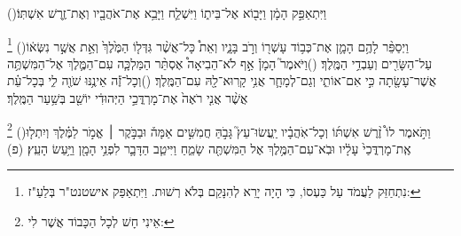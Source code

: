 \documentclass[12pt, openany]{book}
\newcommand{\footnotecomment}[1]{
	\renewcommand\thefootnote{}
	\footnote{\textsf{#1}}}
\newcommand{\commenta}[1]{\footnotecomment{#1}\hspace{0em}}
\newcommand{\vsnum}[1]{(\hebrewnumeral{#1})\space}
\begin{document}
\begin{multicols}{2}
\vsnum{10}וַיִּתְאַפַּ֣ק הָמָ֔ן וַיָּב֖וֹא אֶל־בֵּית֑וֹ וַיִּשְׁלַ֛ח וַיָּבֵ֥א אֶת־אֹהֲבָ֖יו וְאֶת־זֶ֥רֶשׁ אִשְׁתּֽוֹ׃%
\commenta{ נִתְחַזֵּק לַעֲמֹד עַל כַּעְסוֹ, כִּי הָיָה יָרֵא לְהִנָּקֵם בְּלֹא רְשׁוּת. וַיִּתְאַפַּק אישטנט"ר בְּלַעַ"ז: }%
\vsnum{11}וַיְסַפֵּ֨ר לָהֶ֥ם הָמָ֛ן אֶת־כְּב֥וֹד עָשְׁר֖וֹ וְרֹ֣ב בָּנָ֑יו וְאֵת֩ כָּל־אֲשֶׁ֨ר גִּדְּל֤וֹ הַמֶּ֙לֶךְ֙ וְאֵ֣ת אֲשֶׁ֣ר נִשְּׂא֔וֹ עַל־הַשָּׂרִ֖ים וְעַבְדֵ֥י הַמֶּֽלֶךְ׃
\vsnum{12}וַיֹּאמֶר֮ הָמָן֒ אַ֣ף לֹא־הֵבִיאָה֩ אֶסְתֵּ֨ר הַמַּלְכָּ֧ה עִם־הַמֶּ֛לֶךְ אֶל־הַמִּשְׁתֶּ֥ה אֲשֶׁר־עָשָׂ֖תָה כִּ֣י אִם־אוֹתִ֑י וְגַם־לְמָחָ֛ר אֲנִ֥י קָֽרוּא־לָ֖הּ עִם־הַמֶּֽלֶךְ׃
\vsnum{13}וְכָל־זֶ֕ה אֵינֶ֥נּוּ שֹׁוֶ֖ה לִ֑י בְּכָל־עֵ֗ת אֲשֶׁ֨ר אֲנִ֤י רֹאֶה֙ אֶת־מָרְדֳּכַ֣י הַיְּהוּדִ֔י יוֹשֵׁ֖ב בְּשַׁ֥עַר הַמֶּֽלֶךְ׃%
\commenta{ אֵינִי חָשׁ לְכָל הַכָּבוֹד אֲשֶׁר לִי:}%
\vsnum{14}וַתֹּ֣אמֶר לוֹ֩ זֶ֨רֶשׁ אִשְׁתּ֜וֹ וְכָל־אֹֽהֲבָ֗יו יַֽעֲשׂוּ־עֵץ֮ גָּבֹ֣הַּ חֲמִשִּׁ֣ים אַמָּה֒ וּבַבֹּ֣קֶר ׀ אֱמֹ֣ר לַמֶּ֗לֶךְ וְיִתְל֤וּ אֶֽת־מָרְדֳּכַי֙ עָלָ֔יו וּבֹֽא־עִם־הַמֶּ֥לֶךְ אֶל הַמִּשְׁתֶּ֖ה שָׂמֵ֑חַ וַיִּיטַ֧ב הַדָּבָ֛ר לִפְנֵ֥י הָמָ֖ן וַיַּ֥עַשׂ הָעֵֽץ׃ (פ)
\end{multicols}\newpage
\end{document}
